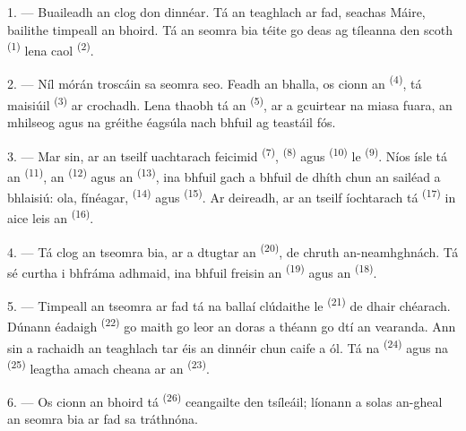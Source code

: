 \VUsaut{3.6mm}
\VUsaut{3.0mm}

1. --- Buaileadh an clog don dinnéar. Tá an teaghlach ar fad, seachas Máire,
bailithe timpeall an bhoird. Tá an seomra bia téite go deas ag 
tíleanna den scoth \textsuperscript{(1)} lena  caol
\textsuperscript{(2)}.

2. --- Níl mórán troscáin sa seomra seo. Feadh an bhalla, os cionn an
 \textsuperscript{(4)}, tá  maisiúil
\textsuperscript{(3)} ar crochadh. Lena thaobh tá an 
\textsuperscript{(5)}, ar a gcuirtear na miasa fuara, an mhilseog agus na
gréithe éagsúla nach bhfuil ag teastáil fós.

3. --- Mar sin, ar an tseilf uachtarach feicimid 
\textsuperscript{(7)},  \textsuperscript{(8)} agus 
\textsuperscript{(10)} le  \textsuperscript{(9)}. Níos ísle tá an
 \textsuperscript{(11)}, an  \textsuperscript{(12)}
agus an  \textsuperscript{(13)}, ina bhfuil gach a bhfuil de
dhíth chun an sailéad a bhlaisiú: ola, fínéagar, 
\textsuperscript{(14)} agus  \textsuperscript{(15)}. Ar deireadh, ar
an tseilf íochtarach tá  \textsuperscript{(17)} in aice leis an
 \textsuperscript{(16)}.

4. --- Tá clog an tseomra bia, ar a dtugtar an 
\textsuperscript{(20)}, de chruth an-neamhghnách. Tá sé curtha i bhfráma adhmaid,
ina bhfuil freisin an  \textsuperscript{(19)} agus an
 \textsuperscript{(18)}.

\VUsaut{4.6mm}
\VUsaut{3.0mm}

5. --- Timpeall an tseomra ar fad tá na ballaí clúdaithe le  \textsuperscript{(21)} de dhair chéarach. Dúnann 
éadaigh \textsuperscript{(22)} go maith go leor an doras a théann go dtí an
vearanda. Ann sin a rachaidh an teaghlach tar éis an dinnéir chun caife a ól. Tá na
 \textsuperscript{(24)} agus na 
\textsuperscript{(25)} leagtha amach cheana ar an 
\textsuperscript{(23)}.

6. --- Os cionn an bhoird tá  \textsuperscript{(26)}
ceangailte den tsíleáil; líonann a solas an-gheal an seomra bia ar fad sa
tráthnóna.

